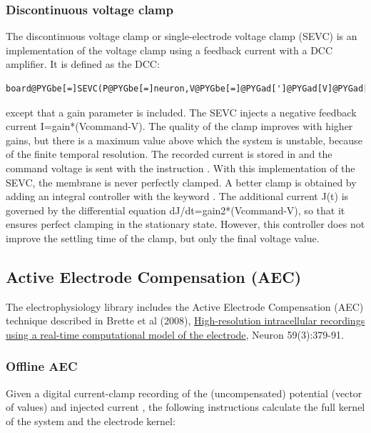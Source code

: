 \documentclass[letterpaper,10pt,english]{manual}
\begin{document}
\subsubsection{Discontinuous voltage clamp}

The discontinuous voltage clamp or single-electrode voltage clamp (SEVC) is
an implementation of the voltage clamp using a feedback current with a DCC
amplifier. It is defined as the DCC:

\begin{Verbatim}[commandchars=@\[\]]
board@PYGbe[=]SEVC(P@PYGbe[=]neuron,V@PYGbe[=]@PYGad[']@PYGad[V]@PYGad['],I@PYGbe[=]@PYGad[']@PYGad[I]@PYGad['],frequency@PYGbe[=]@PYGaw[2]@PYGbe[*]kHz,gain@PYGbe[=]@PYGaw[10]@PYGbe[*]nS)
\end{Verbatim}

except that a gain parameter is included. The SEVC injects a negative
feedback current I=gain*(Vcommand-V). The quality of the clamp improves with
higher gains, but there is a maximum value above which the system is unstable,
because of the finite temporal resolution.
The recorded current is stored in  and the command voltage is sent
with the instruction .
With this implementation of the SEVC, the membrane is never perfectly clamped.
A better clamp is obtained by adding an integral controller with the keyword
. The additional current J(t) is governed by the differential
equation dJ/dt=gain2*(Vcommand-V), so that it ensures perfect clamping in the
stationary state.
However, this controller does not improve the settling time of the clamp, but
only the final voltage value.


\subsection{Active Electrode Compensation (AEC)}

The electrophysiology library includes the Active Electrode Compensation (AEC) technique
described in Brette et al (2008),
\href{http://www.di.ens.fr/\textasciitilde{}brette/papers/Brette2008Neuron.html}{High-resolution intracellular recordings using a real-time computational model of the electrode},
Neuron 59(3):379-91.


\subsubsection{Offline AEC}

Given a digital current-clamp recording of the (uncompensated) potential 
(vector of values) and injected current , the following instructions
calculate the full kernel of the system and the electrode kernel:
\end{document}
